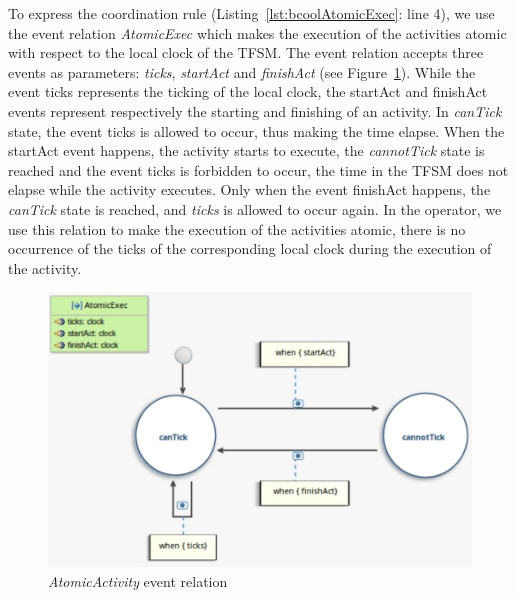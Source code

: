To express the coordination rule (Listing~\ref{lst:bcoolAtomicExec}: line 4), we use the event relation \emph{AtomicExec} which makes the execution of the activities atomic with respect to the local clock of the TFSM. The event relation accepts three events as parameters: \emph{ticks}, \emph{startAct} and \emph{finishAct} (see Figure~\ref{fig:atomicexec}). While the event ticks represents the ticking of the local clock, the startAct and finishAct events represent respectively the starting and finishing of an activity. In \emph{canTick} state, the event ticks is allowed to occur, thus making the time elapse. When the startAct event happens, \ie the activity starts to execute, the \emph{cannotTick} state is reached and the event ticks is forbidden to occur, \ie the time in the TFSM does not elapse while the activity executes. Only when the event finishAct happens, the \emph{canTick} state is reached, and \emph{ticks} is allowed to occur again. In the operator, we use this relation to make the execution of the activities atomic, \ie there is no occurrence of the \dse ticks of the corresponding local clock during the execution of the activity.

	 
	 
	 \begin{figure}
	 	\center
	 	\includegraphics[width=.7\columnwidth]{examples/figs/AtomicExec}
	 	\caption{\emph{AtomicActivity} event relation}
	 	\label{fig:atomicexec}
	 \end{figure}
	 
	 
	 
